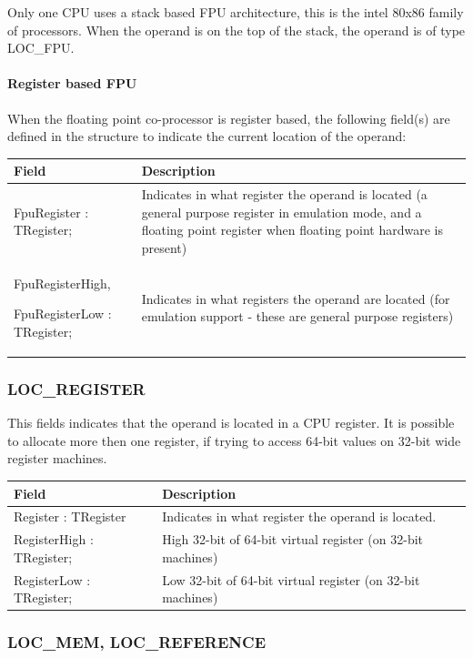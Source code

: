 \documentclass [a4paper,12pt]{article}
\begin{document}
Only one CPU uses a stack based FPU architecture, this is the intel 80x86
family of processors. When the operand is on the top of the stack, the
operand is of type LOC{\_}FPU.

\paragraph{Register based FPU}

When the floating point co-processor is register based, the following
field(s) are defined in the structure to indicate the current location of
the operand:

\begin{longtable}{|l|p{7cm}|}
\hline
Field   & Description \\
\hline
\endhead
\hline
\endfoot
\textsf{FpuRegister : TRegister;}&
    Indicates in what register the operand is located (a general purpose
    register in emulation mode, and a floating point register when floating
    point hardware is present) \\
\textsf{FpuRegisterHigh, } \par 
\textsf{FpuRegisterLow : TRegister;}&
    Indicates in what registers the operand are located (for emulation
    support - these are general purpose registers)
\end{longtable}

\subsubsection{LOC{\_}REGISTER}
\label{subsubsec:mylabel20}

This fields indicates that the operand is located in a CPU register. It is
possible to allocate more then one register, if trying to access 64-bit
values on 32-bit wide register machines.

\begin{longtable}{|l|p{10cm}|}
\hline
Field   & Description \\
\hline
\endhead
\hline
\endfoot
\textsf{Register : TRegister}&
    Indicates in what register the operand is located. \\
\textsf{RegisterHigh : TRegister;}&
    High 32-bit of 64-bit virtual register (on 32-bit machines) \\
\textsf{RegisterLow : TRegister;}&
    Low 32-bit of 64-bit virtual register (on 32-bit machines)
\end{longtable}

\subsubsection{LOC{\_}MEM, LOC{\_}REFERENCE}
\label{subsubsec:mylabel21}
\end{document}
